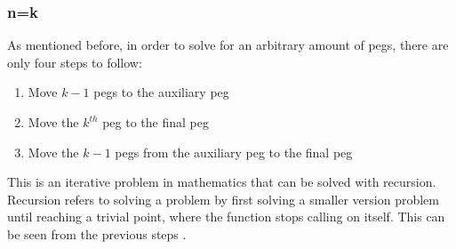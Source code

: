 \documentclass[12pt,a4paper]{article}
\begin{document}
	\subsubsection{n=k}
	As mentioned before, in order to solve for an arbitrary amount of pegs, there are only four steps to follow:
	\begin{enumerate}
		\item Move $k-1$ pegs to the auxiliary peg
		\item Move the $k^{th}$ peg to the final peg
		\item Move the $k-1$ pegs from the auxiliary peg to the final peg
	\end{enumerate}
	This is an iterative problem in mathematics that can be solved with recursion. Recursion refers to solving a problem by first solving a smaller version problem until reaching a trivial point, where the function stops calling on itself. This can be seen from the previous steps \cite{recursion}. 
\end{document}

